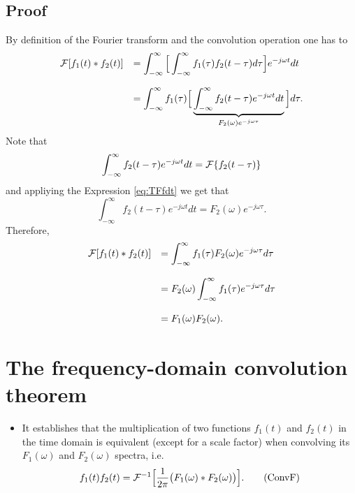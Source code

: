 \subsection*{Proof}
\noindent By definition of the Fourier transform and the convolution
operation one has to
\begin{equation*}
  \begin{array}{rl}
    {\cal F}[f_1(t)*f_2(t)] & = \displaystyle\int_{-\infty}^\infty
    \Big[\int_{-\infty}^\infty
      f_1(\tau)f_2(t-\tau)d\tau\Big]e^{-j\omega t}dt\\\\
    & = \displaystyle\int_{-\infty}^\infty
    f_1(\tau)\Big[\underbrace{\int_{-\infty}^\infty f_2(t-\tau)e^{-j\omega t}dt}_{F_2(\omega)e^{-j\omega\tau}}\Big]d\tau.
  \end{array}
\end{equation*}
Note that
\begin{equation*}
  \int_{-\infty}^\infty f_2(t-\tau)e^{-j\omega t}dt = {\cal{F}}\{f_2(t-\tau)\}
\end{equation*}
and appliying the Expression \ref{eq:TFfdt} we get that
\begin{equation*}
  \int_{-\infty}^\infty f_2(t-\tau)e^{-j\omega t}dt = F_2(\omega)e^{-j\omega\tau}.
\end{equation*}
Therefore,
\begin{equation*}
  \begin{array}{rl}
    {\cal F}[f_1(t)*f_2(t)] & = \displaystyle\int_{-\infty}^\infty
    f_1(\tau)F_2(\omega)e^{-j\omega\tau}d\tau \\\\
    & = F_2(\omega)\displaystyle\int_{-\infty}^\infty f_1(\tau)e^{-j\omega\tau}d\tau\\\\
    & = F_1(\omega)F_2(\omega).
  \end{array}
\end{equation*}

\section{The frequency-domain convolution theorem}
\begin{itemize}
\item It establishes that the multiplication of two functions $f_1(t)$
  and $f_2(t)$ in the time domain is equivalent (except for a scale
  factor) when convolving its $F_1(\omega)$ and $F_2(\omega)$ spectra,
  i.e.
  \begin{equation}
    f_1(t)f_2(t) = {\cal
      F}^{-1}\Big[\frac{1}{2\pi}\big(F_1(\omega)*F_2(\omega)\big)\Big].
    \tag{ConvF}
    \label{eq:teorema_convolucion_frecuencia}
  \end{equation}
\end{itemize}

